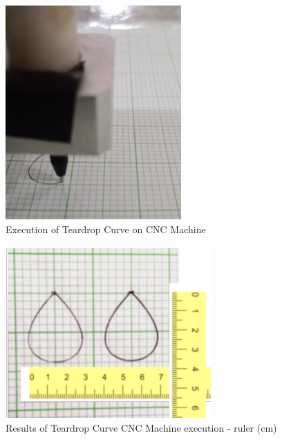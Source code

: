 \begin{figure}
	\centering
	\caption  {Execution of Teardrop Curve on CNC Machine}
	\label{img-Execution of Teardrop Curve on CNC Machine}
	\includegraphics[width=0.60\textwidth]{Chap4/Validation/01-Teardrop-run-on-CNC-Machine.png} 
\end{figure}	

\begin{figure}
	\centering
	\caption  {Results of Teardrop Curve CNC Machine execution - ruler (cm)}
	\label{img-Results of Teardrop Curve CNC Machine execution}
	\includegraphics[width=0.70\textwidth]{Chap4/Validation/02-Teardrop-run-on-CNC-Machine.png} 
\end{figure}

	
\clearpage
\pagebreak


